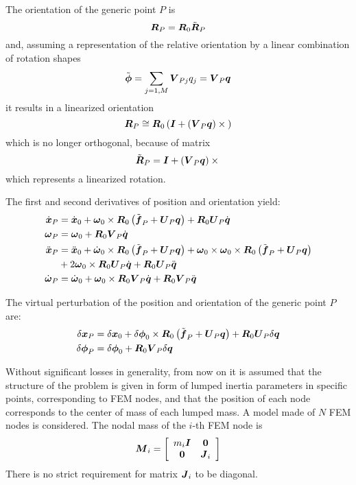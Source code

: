 The orientation of the generic point $P$ is
\begin{equation}
	\T{R}_P = \T{R}_0 \tilde{\T{R}}_P
\end{equation}
and, assuming a representation of the relative orientation by a linear
combination of rotation shapes
\begin{equation}
	\tilde{\T{\phi}} = \sum_{j=1,M} \T{V}_{Pj} q_j = \T{V}_P \T{q}
\end{equation}
it results in a linearized orientation
\begin{equation}
	\T{R}_P \cong \T{R}_0 \plbr{\T{I} + \plbr{\T{V}_P \T{q}}\times{}}
\end{equation}
which is no longer orthogonal, because of matrix
\begin{equation}
	\tilde{\T{R}}_P = \T{I} + \plbr{\T{V}_P \T{q}}\times{}
\end{equation}
which represents a linearized rotation.

The first and second derivatives of position and orientation yield:
\begin{align}
	\dot{\T{x}}_P &= \dot{\T{x}}_0
		+ \T{\omega}_0 \times \T{R}_0 \plbr{\tilde{\T{f}}_P + \T{U}_P \T{q}}
		+ \T{R}_0 \T{U}_P \dot{\T{q}} \\
	\T{\omega}_P &= \T{\omega}_0
		+ \T{R}_0 \T{V}_P \dot{\T{q}} \\
	\ddot{\T{x}}_P &= \ddot{\T{x}}_0
		+ \dot{\T{\omega}}_0 \times \T{R}_0 \plbr{\tilde{\T{f}}_P + \T{U}_P \T{q}}
		+ \T{\omega}_0 \times \T{\omega}_0 \times \T{R}_0 \plbr{\tilde{\T{f}}_P + \T{U}_P \T{q}} \nonumber \\
		& \mbox{} + 2 \T{\omega}_0 \times \T{R}_0 \T{U}_P \dot{\T{q}}
		+ \T{R}_0 \T{U}_P \ddot{\T{q}} \\
	\dot{\T{\omega}}_P &= \dot{\T{\omega}}_0
		+ \T{\omega}_0 \times \T{R}_0 \T{V}_P \dot{\T{q}}
		+ \T{R}_0 \T{V}_P \ddot{\T{q}}
\end{align}

The virtual perturbation of the position and orientation
of the generic point $P$ are:
\begin{align}
	\delta{\T{x}}_P &= \delta{\T{x}}_0
		+ \delta\T{\phi}_0 \times \T{R}_0 \plbr{\tilde{\T{f}}_P + \T{U}_P \T{q}}
		+ \T{R}_0 \T{U}_P \delta{\T{q}} \\
	\delta\T{\phi}_P &= \delta\T{\phi}_0
		+ \T{R}_0 \T{V}_P \delta{\T{q}}
\end{align}

Without significant losses in generality, from now on it is assumed
that the structure of the problem is given in form of lumped inertia
parameters in specific points, corresponding to FEM nodes,
and that the position of each node corresponds to the center of mass
of each lumped mass.
A model made of $N$ FEM nodes is considered.
The nodal mass of the $i$-th FEM node is
\begin{equation}
	\T{M}_i = \sqbr{\matr{cc}{
		m_i \T{I} & \T{0} \\
		\T{0} & \T{J}_i
	}}
\end{equation}
There is no strict requirement for matrix $\T{J}_i$ to be diagonal.

